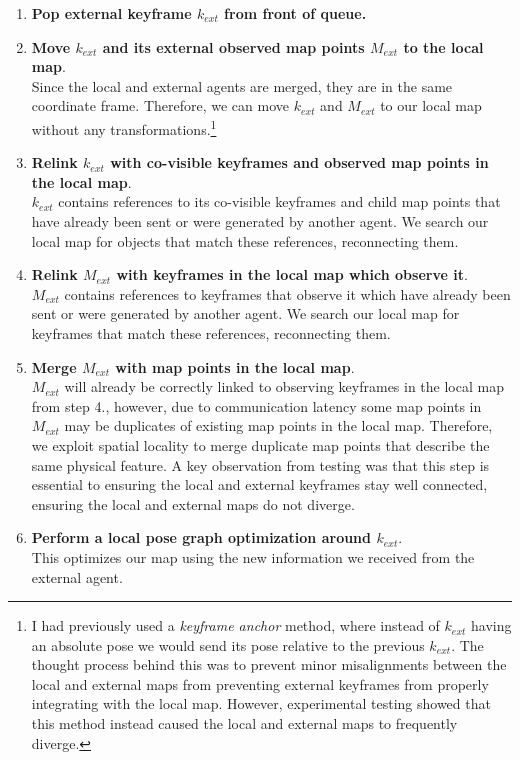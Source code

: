 \begin{enumerate}
    \item \textbf{Pop external keyframe $k_{ext}$ from front of queue.}
    \item \textbf{Move $k_{ext}$ and its external observed map points $M_{ext}$ to the local map}. \\
          Since the local and external agents are merged, they are in the same coordinate frame. Therefore, we can move $k_{ext}$ and $M_{ext}$ to our local map without any transformations.\footnote[1]{I had previously used a \textit{keyframe anchor} method, where instead of $k_{ext}$ having an absolute pose we would send its pose relative to the previous $k_{ext}$. The thought process behind this was to prevent minor misalignments between the local and external maps from preventing external keyframes from properly integrating with the local map. However, experimental testing showed that this method instead caused the local and external maps to frequently diverge.}
    \item \textbf{Relink $k_{ext}$ with co-visible keyframes and observed map points in the local map}. \\
          $k_{ext}$ contains references to its co-visible keyframes and child map points that have already been sent or were generated by another agent. We search our local map for objects that match these references, reconnecting them.
    \item \textbf{Relink $M_{ext}$ with keyframes in the local map which observe it}. \\
          $M_{ext}$ contains references to keyframes that observe it which have already been sent or were generated by another agent. We search our local map for keyframes that match these references, reconnecting them.
    \item \textbf{Merge $M_{ext}$ with map points in the local map}. \\
          $M_{ext}$ will already be correctly linked to observing keyframes in the local map from step 4., however, due to communication latency some map points in $M_{ext}$ may be duplicates of existing map points in the local map. Therefore, we exploit spatial locality to merge duplicate map points that describe the same physical feature. A key observation from testing was that this step is essential to ensuring the local and external keyframes stay well connected, ensuring the local and external maps do not diverge.
    \item \textbf{Perform a local pose graph optimization around $k_{ext}$}. \\
          This optimizes our map using the new information we received from the external agent.
\end{enumerate}


